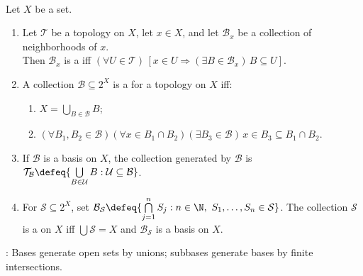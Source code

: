 \begin{definition} \label{def:basis-for-topology} \\
Let $X$ be a set.
\begin{enumerate}[label=(\roman*)]
\setlength{\itemsep}{0pt}
\item Let $\mathcal{T}$ be a topology on $X$, let $x\in X$, and let $\mathcal{B}_x$ be a collection of neighborhoods of $x$.\\
Then $\mathcal{B}_x$ is a  iff $(\forall U\in\mathcal{T})\,[x\in U\Rightarrow(\exists B\in\mathcal{B}_x)\,B\subseteq U]$.
\item A collection $\mathcal{B}\subseteq 2^X$ is a  for a topology on $X$ iff:
\begin{enumerate}[label=(\alph*)]
\setlength{\itemsep}{0pt}
\item $X=\bigcup\limits_{B\in\mathcal{B}}B$;
\item $(\forall B_1,B_2\in\mathcal{B})(\forall x\in B_1\cap B_2)(\exists B_3\in\mathcal{B})\,x\in B_3\subseteq B_1\cap B_2$.
\end{enumerate}
\item If $\mathcal{B}$ is a basis on $X$, the collection generated by $\mathcal{B}$ is $\mathcal{T}_{\mathcal{B}}\defeq\{\bigcup\limits_{B\in\mathcal{U}}B:\mathcal{U}\subseteq\mathcal{B}\}$.
\item For $\mathcal{S}\subseteq 2^X$, set $\mathcal{B}_{\mathcal{S}}\defeq\{\bigcap\limits_{j=1}^{n}S_j:n\in\N,\ S_1,\ldots,S_n\in\mathcal{S}\}$. The collection $\mathcal{S}$ is a  on $X$ iff $\bigcup\mathcal{S}=X$ and $\mathcal{B}_{\mathcal{S}}$ is a basis on $X$.
\end{enumerate}
: Bases generate open sets by unions; subbases generate bases by finite intersections.
\end{definition}

